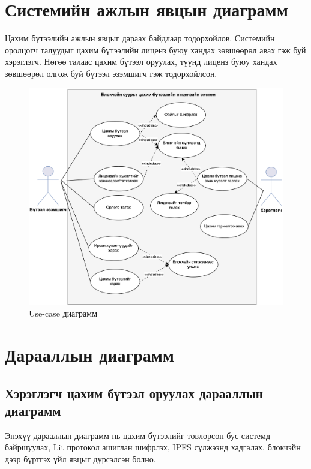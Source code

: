 \section{Системийн ажлын явцын диаграмм}
Цахим бүтээлийн ажлын явцыг дараах байдлаар тодорхойлов. Системийн оролцогч талуудыг цахим бүтээлийн лиценз буюу хандах зөвшөөрөл авах гэж буй хэрэглэгч. Нөгөө талаас цахим бүтээл оруулах, түүнд лиценз буюу хандах зөвшөөрөл олгож буй бүтээл эзэмшигч гэж тодорхойлсон.
\begin{figure}[h!]
	\includegraphics[scale=0.36]{src/images/usecase.png}
	\caption{Use-case диаграмм}
\end{figure}

\newpage
\pagebreak
\section{Дарааллын диаграмм}
\subsection{Хэрэглэгч цахим бүтээл оруулах дарааллын диаграмм}
Энэхүү дарааллын диаграмм нь цахим бүтээлийг төвлөрсөн бус системд байршуулах, Lit протокол ашиглан шифрлэх, IPFS сүлжээнд хадгалах, блокчэйн дээр бүртгэх үйл явцыг дүрсэлсэн болно.

